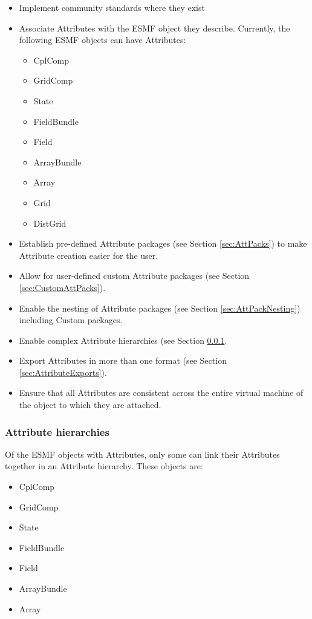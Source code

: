 \begin{itemize}
  \item Implement community standards where they exist
  \item Associate Attributes with the ESMF object they describe. Currently, the following ESMF objects can have Attributes:
  \begin{itemize}
     \item CplComp
     \item GridComp
     \item State
     \item FieldBundle
     \item Field
     \item ArrayBundle
     \item Array
     \item Grid
     \item DistGrid
     \end{itemize}
  \item Establish pre-defined Attribute packages (see Section \ref{sec:AttPacks}) to make Attribute creation easier for the user.
  \item Allow for user-defined custom Attribute packages (see Section \ref{sec:CustomAttPacks}).
  \item Enable the nesting of Attribute packages (see Section \ref{sec:AttPackNesting}) including Custom packages.
  \item Enable complex Attribute hierarchies (see Section \ref{sec:AttHier}.
  \item Export Attributes in more than one format (see Section \ref{sec:AttributeExports}).
  \item Ensure that all Attributes are consistent across the entire virtual machine of the object to which they are attached.
\end{itemize}

\subsubsection{Attribute hierarchies}
\label{sec:AttHier}

Of the ESMF objects with Attributes, only some can link their Attributes together in an Attribute hierarchy.  These objects are:

\begin{itemize}
\item CplComp
\item GridComp
\item State
\item FieldBundle
\item Field
\item ArrayBundle
\item Array
\end{itemize}

